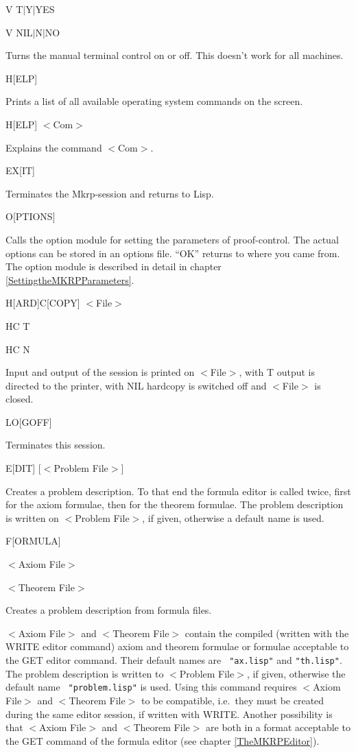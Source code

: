  
\parbox[t]{3cm}{V  T$|$Y$|$YES

V  NIL$|$N$|$NO}\hfill\parbox[t]{11cm}{Turns the manual terminal 
control on or off. This doesn't work for all machines.}

\parbox[t]{3cm}{H[ELP] }\hfill\parbox[t]{11cm}{Prints a list of all 
available operating system commands on the screen.
 }

\parbox[t]{3cm}{H[ELP] $<$Com$>$}\hfill\parbox[t]{11cm}{Explains the 
command $<$Com$>$.}

\parbox[t]{3cm}{EX[IT]}\hfill\parbox[t]{11cm}{Terminates the {\sc
Mkrp}-session and returns to Lisp.  }

O[PTIONS]\hfill\parbox[t]{11cm}{Calls the option module for setting
the parameters of proof-control. The actual options can be stored in
an options file.  ``OK'' returns to where you came from. The option
module is described in detail in chapter \ref{SettingtheMKRPParameters}.
  }

\parbox[t]{4cm}{H[ARD]C[COPY]   $<$File$>$

  
HC     T

HC    N }\hfill\parbox[t]{11cm}{Input and output of the session 
is printed on $<$File$>$, with T output is directed to the printer, with 
NIL hardcopy is switched off and $<$File$>$ is closed.}

LO[GOFF]\hfill\parbox[t]{11cm}{Terminates this session.
 }

E[DIT] [$<$Problem File$>$]\hfill\parbox[t]{11cm}{Creates a problem
description. To that end the formula editor is called
 
twice, 	first for the axiom formulae, then for the theorem
formulae.  The problem description is written on $<$Problem File$>$,
if given, otherwise a default name is used.}

\parbox[t]{4cm}{F[ORMULA]

 
\quad $<$Axiom  File$>$  

\quad$<$Theorem File$>$ 

 }
\hfill\parbox[t]{11cm}{
Creates a problem description from formula files.
 
$<$Axiom File$>$ and $<$Theorem File$>$ contain the compiled (written
with the WRITE editor command) axiom and theorem formulae or formulae
acceptable to the GET editor command. Their default names are {\tt
"ax.lisp"} and {\tt "th.lisp"}. The problem description is written to
$<$Problem File$>$, if given, otherwise the default name {\tt
"problem.lisp"} is used. Using this command requires $<$Axiom File$>$
and $<$Theorem File$>$ to be compatible, i.e.\ they must be created
during the same editor session, if written with WRITE.  Another
possibility is that $<$Axiom File$>$ and $<$Theorem File$>$ are both
in a format acceptable to the GET command of the formula editor (see
chapter \ref{TheMKRPEditor}).}


